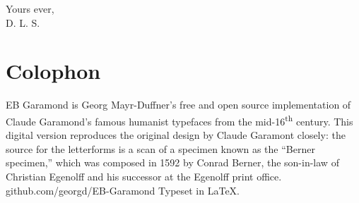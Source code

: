 \documentclass[
paper=a5,
BCOR=7mm,
twoside,
DIV=calc,
12pt,
usegeometry,
chapterprefix,
headings=big]{scrbook} %
\begin{document}
\begin{flushright}
Yours ever,\\
D. L. S.
\end{flushright}

\footskip=30pt


\mainmatter
\pagestyle{headings}
\renewcommand*{\chapterpagestyle}{plain}

















\clearpage
{}
\chapter*{Colophon}
\begin{center}
EB Garamond is Georg Mayr-Duffner's free and open source implementation of Claude Garamond’s famous humanist typefaces from the mid-16\textsuperscript{th} century. This digital version reproduces the original design by Claude Garamont closely: the source for the letterforms is a scan of a specimen known as the \enquote{Berner specimen,} which was composed in 1592 by Conrad Berner, the son-in-law of Christian Egenolff and his successor at the Egenolff print office.  \\github.com/georgd/EB-Garamond
\vfill
Typeset in \LaTeX{}.
\end{center}
\thispagestyle{empty}
\end{document}
